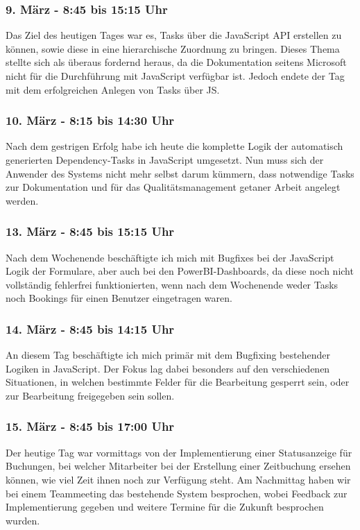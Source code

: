 \subsubsection*{9. März - 8:45 bis 15:15 Uhr}
Das Ziel des heutigen Tages war es, Tasks über die JavaScript API erstellen zu können, sowie diese in eine hierarchische Zuordnung zu bringen. Dieses Thema stellte sich als überaus fordernd heraus, da die Dokumentation seitens Microsoft nicht für die Durchführung mit JavaScript verfügbar ist. Jedoch endete der Tag mit dem erfolgreichen Anlegen von Tasks über JS.

\subsubsection*{10. März - 8:15 bis 14:30 Uhr}
Nach dem gestrigen Erfolg habe ich heute die komplette Logik der automatisch generierten Dependency-Tasks in JavaScript umgesetzt. Nun muss sich der Anwender des Systems nicht mehr selbst darum kümmern, dass notwendige Tasks zur Dokumentation und für das Qualitätsmanagement getaner Arbeit angelegt werden.

\subsubsection*{13. März - 8:45 bis 15:15 Uhr}
Nach dem Wochenende beschäftigte ich mich mit Bugfixes bei der JavaScript Logik der Formulare, aber auch bei den PowerBI-Dashboards, da diese noch nicht vollständig fehlerfrei funktionierten, wenn nach dem Wochenende weder Tasks noch Bookings für einen Benutzer eingetragen waren.

\subsubsection*{14. März - 8:45 bis 14:15 Uhr}
An diesem Tag beschäftigte ich mich primär mit dem Bugfixing bestehender Logiken in JavaScript. Der Fokus lag dabei besonders auf den verschiedenen Situationen, in welchen bestimmte Felder für die Bearbeitung gesperrt sein, oder zur Bearbeitung freigegeben sein sollen.

\subsubsection*{15. März - 8:45 bis 17:00 Uhr}
Der heutige Tag war vormittags von der Implementierung einer Statusanzeige für Buchungen, bei welcher Mitarbeiter bei der Erstellung einer Zeitbuchung ersehen können, wie viel Zeit ihnen noch zur Verfügung steht. Am Nachmittag haben wir bei einem Teammeeting das bestehende System besprochen, wobei Feedback zur Implementierung gegeben und weitere Termine für die Zukunft besprochen wurden.

